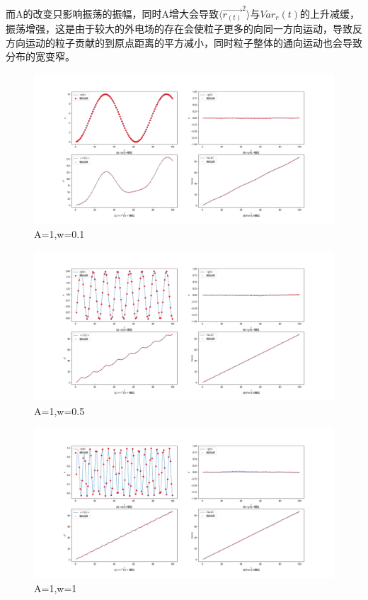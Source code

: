 \documentclass{article}
\begin{document}
	
	而A的改变只影响振荡的振幅，同时A增大会导致$ \langle \vec{r_{(t)}}^2\rangle $与$ Var_r(t) $的上升减缓，振荡增强，这是由于较大的外电场的存在会使粒子更多的向同一方向运动，导致反方向运动的粒子贡献的到原点距离的平方减小，同时粒子整体的通向运动也会导致分布的宽变窄。
		\begin{figure}[!h]
		
		\centering
		\includegraphics[scale=0.4]{A1w0.1}
		\caption{\heiti{}A=1,w=0.1}
		
	\end{figure}
		\begin{figure}[!h]
	
	\centering
	\includegraphics[scale=0.4]{A1w0.5}
	\caption{\heiti{}A=1,w=0.5}
	
\end{figure}
		\begin{figure}[!h]
	
	\centering
	\includegraphics[scale=0.4]{A1w1}
	\caption{\heiti{}A=1,w=1}
	
\end{figure}
\end{document}
